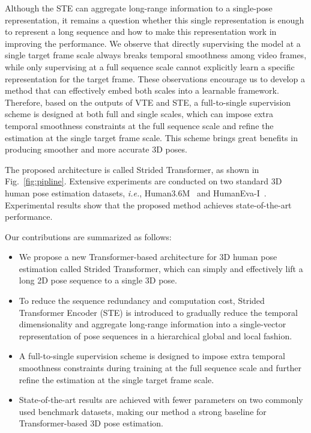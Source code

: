 \documentclass[journal]{IEEEtran}
\begin{document}
Although the STE can aggregate long-range information to a single-pose representation, it remains a question whether this single representation is enough to represent a long sequence and how to make this representation work in improving the performance. 
We observe that directly supervising the model at a single target frame scale always breaks temporal smoothness among video frames, while only supervising at a full sequence scale cannot explicitly learn a specific representation for the target frame. 
These observations encourage us to develop a method that can effectively embed both scales into a learnable framework. 
Therefore, based on the outputs of VTE and STE, a full-to-single supervision scheme is designed at both full and single scales, which can impose extra temporal smoothness constraints at the full sequence scale and refine the estimation at the single target frame scale. 
This scheme brings great benefits in producing smoother and more accurate 3D poses. 

The proposed architecture is called Strided Transformer, as shown in Fig.~\ref{fig:pipline}. 
Extensive experiments are conducted on two standard 3D human pose estimation datasets, \emph{i.e.}, Human3.6M~\cite{ionescu2013human3} and HumanEva-I~\cite{sigal2010humaneva}. 
Experimental results show that the proposed method achieves state-of-the-art performance. 

Our contributions are summarized as follows:
\begin{itemize}
   \item We propose a new Transformer-based architecture for 3D human pose estimation called Strided Transformer, which can simply and effectively lift a long 2D pose sequence to a single 3D pose. 

   \item To reduce the sequence redundancy and computation cost, Strided Transformer Encoder (STE) is introduced to gradually reduce the temporal dimensionality and aggregate long-range information into a single-vector representation of pose sequences in a hierarchical global and local fashion. 
   \item A full-to-single supervision scheme is designed to impose extra temporal smoothness constraints during training at the full sequence scale and further refine the estimation at the single target frame scale. 

   \item State-of-the-art results are achieved with fewer parameters on two commonly used benchmark datasets, making our method a strong baseline for Transformer-based 3D pose estimation. 
\end{itemize}
\end{document}
